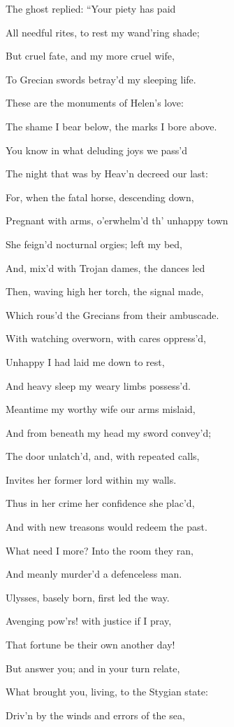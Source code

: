 The ghost replied: “Your piety has paid

All needful rites, to rest my wand’ring shade;

But cruel fate, and my more cruel wife,

To Grecian swords betray’d my sleeping life.

These are the monuments of Helen’s love:

The shame I bear below, the marks I bore above.

You know in what deluding joys we pass’d

The night that was by Heav’n decreed our last:

For, when the fatal horse, descending down,

Pregnant with arms, o’erwhelm’d th’ unhappy town

She feign’d nocturnal orgies; left my bed,

And, mix’d with Trojan dames, the dances led

Then, waving high her torch, the signal made,

Which rous’d the Grecians from their ambuscade.

With watching overworn, with cares oppress’d,

Unhappy I had laid me down to rest,

And heavy sleep my weary limbs possess’d.

Meantime my worthy wife our arms mislaid,

And from beneath my head my sword convey’d;

The door unlatch’d, and, with repeated calls,

Invites her former lord within my walls.

Thus in her crime her confidence she plac’d,

And with new treasons would redeem the past.

What need I more? Into the room they ran,

And meanly murder’d a defenceless man.

Ulysses, basely born, first led the way.

Avenging pow’rs! with justice if I pray,

That fortune be their own another day!

But answer you; and in your turn relate,

What brought you, living, to the Stygian state:

Driv’n by the winds and errors of the sea,


